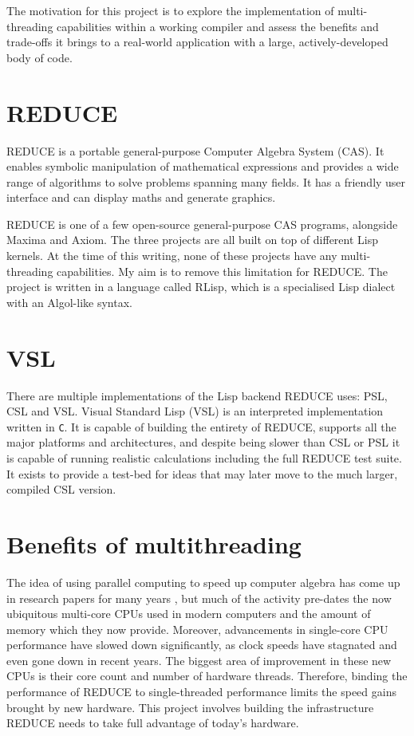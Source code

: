 The motivation for this project is to explore the implementation of multi-threading
capabilities within a working compiler and assess the benefits and trade-offs it brings
to a real-world application with a large, actively-developed body of code.

\section{REDUCE}

REDUCE \cite{reduce} is a portable general-purpose Computer Algebra System (CAS). It enables symbolic
manipulation of mathematical expressions and provides a wide range of algorithms
to solve problems spanning many fields.
It has a friendly user interface and can display maths and generate graphics.

REDUCE is one of a few open-source general-purpose CAS programs, alongside Maxima and Axiom.
The three projects are all built on top of different Lisp kernels. At the time of this writing,
none of these projects have any multi-threading capabilities. My aim is to remove this limitation
for REDUCE. The project is written in a language called RLisp, which is a specialised
Lisp dialect with an Algol-like syntax.

\section{VSL}

There are multiple implementations of the Lisp backend REDUCE uses: PSL, CSL and VSL.
Visual Standard Lisp (VSL) is an interpreted implementation written
in \texttt{C}. It is capable of building the entirety of REDUCE, supports all the major
platforms and architectures, and despite being slower than CSL or PSL it is capable of
running realistic calculations including the full REDUCE test suite.
It exists to provide a test-bed for ideas that may later move to the much larger,
compiled CSL version.

\section{Benefits of multithreading}
The idea of using parallel computing to speed up computer algebra has come
up in research papers for many years \cite{algebra-parallelism},
but much of the activity
pre-dates the now ubiquitous multi-core CPUs used in modern computers and the amount of memory
which they now provide. Moreover, advancements in single-core CPU performance have slowed down
significantly, as clock speeds have stagnated and even gone down in recent years. The biggest
area of improvement in these new CPUs is their core count and number of hardware threads.
Therefore, binding the performance of REDUCE to single-threaded performance limits the speed gains
brought by new hardware. This project involves building the infrastructure
REDUCE needs to take full advantage of today's hardware.

